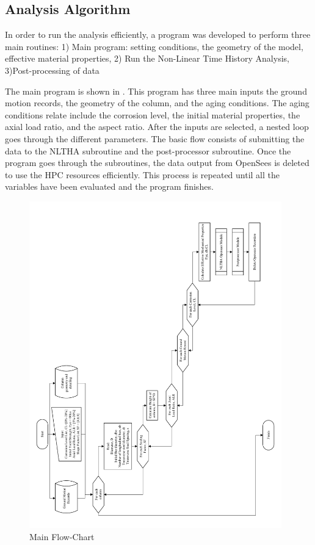 \subsection{Analysis Algorithm}

In order to run the analysis efficiently, a program was developed to perform three main routines:
1) Main program: setting conditions, the geometry of the model, effective material properties, 2) Run the Non-Linear Time History Analysis, 3)Post-processing of data

The main program is shown in . This program has three main inputs the ground motion records, the geometry of the column, and the aging conditions. The aging conditions relate include the corrosion level, the initial material properties, the axial load ratio, and the aspect ratio. After the inputs are selected, a nested loop goes through the different parameters.  The basic flow consists of submitting the data to the NLTHA subroutine and the post-processor subroutine. Once the program goes through the subroutines, the data output from OpenSees is deleted to use the HPC resources efficiently. This process is repeated until all the variables have been evaluated and the program finishes.

\begin{figure}[htp]
	\centering
	\includegraphics[width=0.975\textwidth]{VAC Thesis 2.0/Chapter-5/figs/Main_FlowChart_01.pdf}
	\caption{Main Flow-Chart}
	\label{fig:main_flowchart}
\end{figure}

